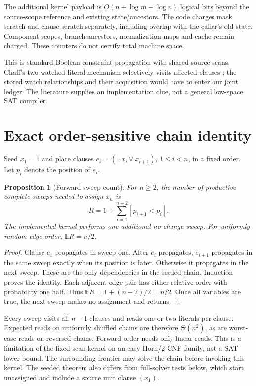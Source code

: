 \documentclass[11pt]{article}
\newtheorem{proposition}{Proposition}
\begin{document}
The additional kernel payload is $O(n+\log m+\log n)$ logical bits
beyond the source-scope reference and existing state/ancestors.
The code charges mask scratch and clause scratch separately, including
overlap with the caller's old state. Component scopes, branch ancestors,
normalization maps and cache remain charged. These counters do not
certify total machine space.

This is standard Boolean constraint propagation with shared source scans.
Chaff's two-watched-literal mechanism selectively visits affected clauses
\cite{chaff}; the stored watch relationships and their acquisition would
have to enter our joint ledger. The literature supplies an implementation
clue, not a general low-space SAT compiler.

\section{Exact order-sensitive chain identity}
Seed $x_1=1$ and place clauses $e_i=(\neg x_i\lor x_{i+1})$,
$1\le i<n$, in a fixed order. Let $p_i$ denote the position of $e_i$.
\begin{proposition}[Forward sweep count]
For $n\ge2$, the number of productive complete sweeps needed to assign
$x_n$ is
\[
R=1+\sum_{i=1}^{n-2}[p_{i+1}<p_i].
\]
The implemented kernel performs one additional no-change sweep.
For uniformly random edge order, $\mathbb E R=n/2$.
\end{proposition}
\begin{proof}
Clause $e_1$ propagates in sweep one. After $e_i$ propagates,
$e_{i+1}$ propagates in the same sweep exactly when its position is
later. Otherwise it propagates in the next sweep. These are the only
dependencies in the seeded chain. Induction proves the identity.
Each adjacent edge pair has either relative order with probability
one half. Thus $\mathbb E R=1+(n-2)/2=n/2$. Once all variables are
true, the next sweep makes no assignment and returns.
\end{proof}
Every sweep visits all $n-1$ clauses and reads one or two literals
per clause. Expected reads on uniformly shuffled chains are therefore
$\Theta(n^2)$, as are worst-case reads on reversed chains. Forward
order needs only linear reads. This is a limitation of the fixed-scan
kernel on an easy Horn/2-CNF family, not a SAT lower bound.
The surrounding frontier may solve the chain before invoking this kernel.
The seeded theorem also differs from full-solver tests below, which
start unassigned and include a source unit clause $(x_1)$.
\end{document}

